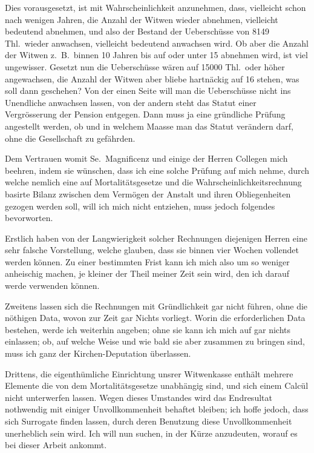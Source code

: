 \documentclass[12pt,a4paper]{article}
\begin{document}
Dies vorausgesetzt, ist mit Wahrscheinlichkeit anzunehmen, dass, vielleicht schon nach wenigen Jahren, die Anzahl der Witwen wieder abnehmen, vielleicht bedeutend abnehmen, und also der Bestand der Uebersch\"usse von 8149 Thl.\ wieder anwachsen, vielleicht bedeutend anwachsen wird. Ob aber die Anzahl der Witwen z.\ B.\ binnen 10 Jahren bis auf oder unter 15 abnehmen wird, ist viel ungewisser. Gesetzt nun die Uebersch\"usse w\"aren auf 15000 Thl.\ oder h\"oher angewachsen, die Anzahl der Witwen aber bliebe hartn\"ackig auf 16 stehen, was soll dann geschehen? Von der einen Seite will man die Uebersch\"usse nicht ins Unendliche anwachsen lassen, von der andern steht das Statut einer Vergr\"osserung der Pension entgegen. Dann muss ja eine gr\"undliche Pr\"ufung angestellt werden, ob und in welchem Maasse man das Statut ver\"andern darf, ohne die Gesellschaft zu gef\"ahrden.

Dem Vertrauen womit Se.\ Magnificenz und einige der Herren Collegen mich beehren, indem sie w\"unschen, dass ich eine solche Pr\"ufung auf mich nehme, durch welche nemlich eine auf Mortalit\"atsgesetze und die Wahrscheinlichkeitsrechnung basirte Bilanz zwischen dem Verm\"ogen der Anstalt und ihren Obliegenheiten gezogen werden soll, will ich mich nicht entziehen, muss jedoch folgendes bevorworten.

Erstlich haben von der Langwierigkeit solcher Rechnungen diejenigen Herren eine sehr falsche Vorstellung, welche glauben, dass sie binnen vier Wochen vollendet werden k\"onnen. Zu einer bestimmten Frist kann ich mich also um so weniger anheischig machen, je kleiner der Theil meiner Zeit sein wird, den ich darauf werde verwenden k\"onnen.

Zweitens lassen sich die Rechnungen mit Gr\"undlichkeit gar nicht f\"uhren, ohne die n\"othigen Data, wovon zur Zeit gar Nichts vorliegt. Worin die erforderlichen Data bestehen, werde ich weiterhin angeben; ohne sie kann ich mich auf gar nichts einlassen; ob, auf welche Weise und wie bald sie aber zusammen zu bringen sind, muss ich ganz der Kirchen-Deputation \"uberlassen.

Drittens, die eigenth\"umliche Einrichtung unsrer Witwenkasse enth\"alt mehrere Elemente die von dem Mortalit\"atsgesetze unabh\"angig sind, und sich einem Calc\"ul nicht unterwerfen lassen. Wegen dieses Umstandes wird das Endresultat nothwendig mit einiger Unvollkommenheit behaftet bleiben; ich hoffe jedoch, dass sich Surrogate finden lassen, durch deren Benutzung diese Unvollkommenheit unerheblich sein wird. Ich will nun suchen, in der K\"urze anzudeuten, worauf es bei dieser Arbeit ankommt.
\end{document}
